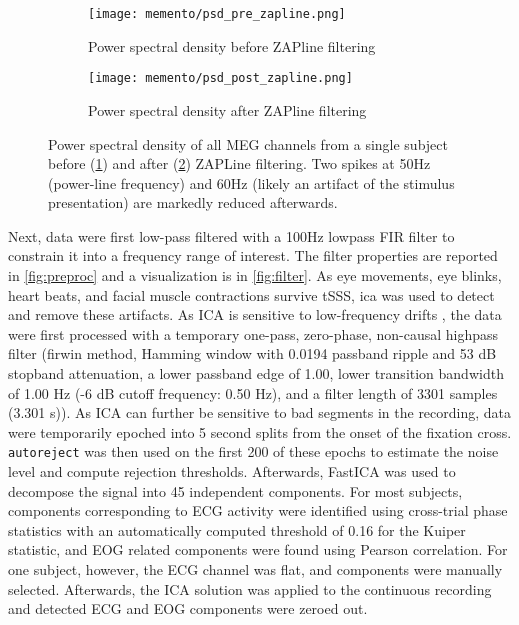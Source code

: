 \begin{figure}
	\begin{subfigure}{.49\textwidth}
		\texttt{[image: memento/psd\_pre\_zapline.png]}
		\caption{Power spectral density before ZAPline filtering}
		\label{fig:prezap}
	\end{subfigure}
	\begin{subfigure}{.49\textwidth}
		\texttt{[image: memento/psd\_post\_zapline.png]}
		\caption{Power spectral density after ZAPline filtering}
		\label{fig:postzap}
	\end{subfigure}
	\caption[Power spectral density before and after ZAPLine filtering]{Power spectral density of all MEG channels
		from a single subject before (\ref{fig:prezap}) and after (\ref{fig:postzap}) ZAPLine filtering.
		Two spikes at 50Hz (power-line frequency) and 60Hz (likely an artifact of the stimulus presentation) are markedly reduced afterwards.
	}
	\label{fig:zapline_psd}
\end{figure}

Next, data were first low-pass filtered with a 100Hz lowpass FIR filter to constrain it into a frequency range of interest.
The filter properties are reported in \ref{fig:preproc} and a visualization is in \ref{fig:filter}.
As eye movements, eye blinks, heart beats, and facial muscle contractions survive \gls{tSSS}, \gls{ica} was used to detect and remove these artifacts.
As ICA is sensitive to low-frequency drifts \citep{winkler2015ICA}, the data were first processed with a temporary one-pass, zero-phase, non-causal highpass filter (firwin method, Hamming window with 0.0194 passband ripple and 53 dB stopband attenuation, a lower passband edge of 1.00, lower transition bandwidth of 1.00 Hz (-6 dB cutoff frequency: 0.50 Hz), and a filter length of 3301 samples (3.301 s)).
As ICA can further be sensitive to bad segments in the recording, data were temporarily epoched into 5 second splits from the onset of the fixation cross.
\texttt{autoreject} was then used on the first 200 of these epochs to estimate the noise level and compute rejection thresholds.
Afterwards, FastICA \citep{hyvarinen1999fast} was used to decompose the signal into 45 independent components.
For most subjects, components corresponding to ECG activity were identified using cross-trial phase statistics \citep{dammers2008integration} with an automatically computed threshold of 0.16 for the Kuiper statistic, and EOG related components were found using Pearson correlation.
For one subject, however, the ECG channel was flat, and components were manually selected.
Afterwards, the ICA solution was applied to the continuous recording and detected ECG and EOG components were zeroed out.

